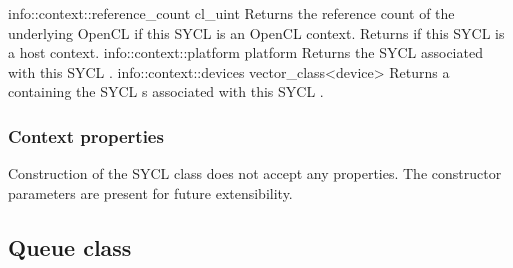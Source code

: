 \addInfoRow
{info::context::reference_count}
{cl_uint}
{
  Returns the reference count of the underlying OpenCL  if this SYCL  is an OpenCL context. Returns  if this SYCL  is a host context.
}
\addInfoRow
{info::context::platform}
{platform}
{
  Returns the SYCL  associated with this SYCL .
}
\addInfoRow
{info::context::devices}
{vector_class<device>}
{
  Returns a  containing the SYCL s associated with this SYCL .
}
\completeInfoTable



\subsubsection{Context properties}
\label{sec:context-properties}

Construction of the SYCL  class does not accept any properties.
The  constructor parameters are present for future extensibility.



\subsection{Queue class}
\label{sec:interface.queue.class}


